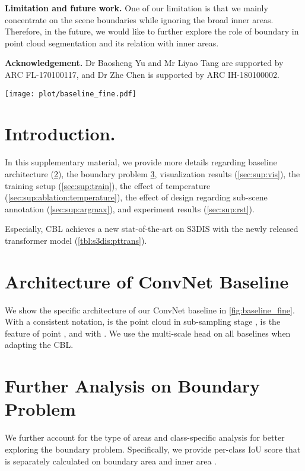 \documentclass[10pt,twocolumn,letterpaper]{article}
\begin{document}
\noindent\textbf{Limitation and future work.}
One of our limitation is that we mainly concentrate on the scene boundaries while ignoring the broad inner areas. Therefore, in the future, we would like to further explore the role of boundary in point cloud segmentation and its relation with inner areas.

\noindent\textbf{Acknowledgement.}
Dr Baosheng Yu and Mr Liyao Tang are supported by ARC FL-170100117, and Dr Zhe Chen is supported by ARC IH-180100002.



{\small


}

\onecolumn
\newpage
\twocolumn

\appendix


\begin{figure*}
\centering
    \texttt{[image: plot/baseline\_fine.pdf]}
    \caption{The detail architecture of ConvNet baseline.}
    \label{fig:baseline_fine}
\end{figure*}

\section{Introduction.}
In this supplementary material, we provide more details regarding baseline architecture (\cref{sec:sup:baseline}), the boundary problem \cref{sec:sup:bound}, visualization results (\cref{sec:sup:vis}), the training setup (\cref{sec:sup:train}), the effect of temperature (\cref{sec:sup:ablation:temperature}), the effect of design regarding sub-scene annotation (\cref{sec:sup:argmax}), and experiment results (\cref{sec:sup:rst}).

Especially, CBL achieves a new stat-of-the-art on S3DIS with the newly released transformer model (\cref{tbl:s3dis:pttrans}). 

\section{Architecture of ConvNet Baseline}
\label{sec:sup:baseline}
We show the specific architecture of our ConvNet baseline in \cref{fig:baseline_fine}. With a consistent notation,  is the point cloud in sub-sampling stage ,  is the feature of point , and  with . We use the multi-scale head on all baselines when adapting the CBL.

\section{Further Analysis on Boundary Problem}
\label{sec:sup:bound}
We further account for the type of areas and class-specific analysis for better exploring the boundary problem. Specifically, we provide per-class IoU score that is separately calculated on boundary area  and inner area .
\end{document}
